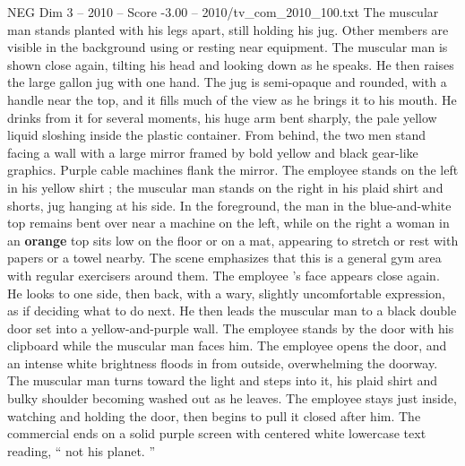 \begin{textsample}{NEG Dim 3 – 2010 – Score -3.00 – 2010/tv\_com\_2010\_100.txt}
The muscular man stands planted with his legs apart, still holding his jug.
Other members are visible in the background using or resting near equipment.
The muscular man is shown close again, tilting his head and looking down as he speaks.
He then raises the large gallon jug with one hand.
The jug is semi-opaque and rounded, with a handle near the top, and it fills much of the view as he brings it to his mouth.
He drinks from it for several moments, his huge arm bent sharply, the pale yellow liquid sloshing inside the plastic container.
From behind, the two men stand facing a wall with a large mirror framed by bold yellow and black gear-like graphics.
Purple cable machines flank the mirror.
The employee stands on the left in his yellow shirt ; the muscular man stands on the right in his plaid shirt and shorts, jug hanging at his side.
In the foreground, the man in the blue-and-white top remains bent over near a machine on the left, while on the right a woman in an \textbf{orange} top sits low on the floor or on a mat, appearing to stretch or rest with papers or a towel nearby.
The scene emphasizes that this is a general gym area with regular exercisers around them.
The employee ’s face appears close again.
He looks to one side, then back, with a wary, slightly uncomfortable expression, as if deciding what to do next.
He then leads the muscular man to a black double door set into a yellow-and-purple wall.
The employee stands by the door with his clipboard while the muscular man faces him.
The employee opens the door, and an intense white brightness floods in from outside, overwhelming the doorway.
The muscular man turns toward the light and steps into it, his plaid shirt and bulky shoulder becoming washed out as he leaves.
The employee stays just inside, watching and holding the door, then begins to pull it closed after him.
The commercial ends on a solid purple screen with centered white lowercase text reading, “ not his planet. ”

\end{textsample}
